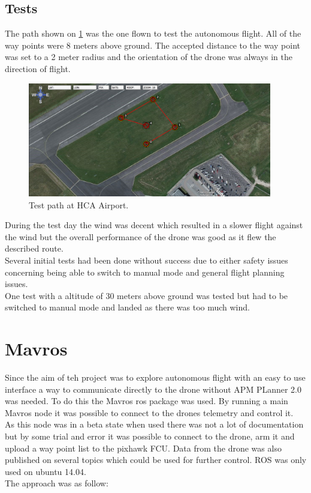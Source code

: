  
\subsection{Tests}
The path shown on \ref{fig:HCAPath} was the one flown to test the autonomous flight. All of the way points were 8 meters above ground. The accepted distance to the way point was set to a 2 meter radius and the orientation of the drone was always in the direction of flight. 

\begin{figure}[H]
  \centering
    \includegraphics[width=0.95\textwidth]{./Images/HCAPath}
  \caption{Test path at HCA Airport.}
  \label{fig:HCAPath}
\end{figure}

During the test day the wind was decent which resulted in a slower flight against the wind but the overall performance of the drone was good as it flew the described route. \\

Several initial tests had been done without success due to either safety issues concerning being able to switch to manual mode and general flight planning issues.\\

One test with a altitude of 30 meters above ground was tested but had to be switched to manual mode and landed as there was too much wind.\\
 
\section{Mavros}
Since the aim of teh project was to explore autonomous flight with an easy to use interface a way to communicate directly to the drone without APM PLanner 2.0 was needed. To do this the Mavros \cite{Ref:Mavros} ros package was used. By running a main Mavros node it was possible to connect to the drones telemetry and control it.\\
As this node was in a beta state when used there was not a lot of documentation but by some trial and error it was possible to connect to the drone, arm it and upload a way point list to the pixhawk FCU. Data from the drone was also published on several topics which could be used for further control. ROS was only used on ubuntu 14.04.\\
The approach was as follow:


